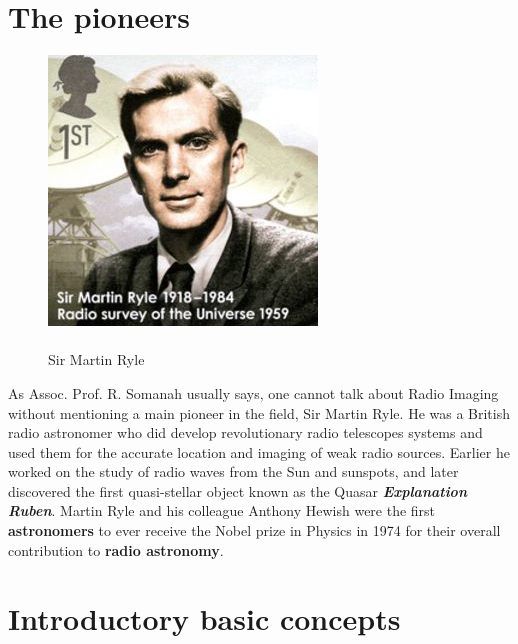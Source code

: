 \section{The pioneers}
\label{sec:pioneers}
\begin{figure}

  \begin{center}
    \includegraphics[scale= 0.45]{Figures/Sir-Martin-Ryle-C}
  \end{center}
  
 	\caption[Sir Martin Ryle]{\\Sir Martin Ryle}
	\label{fig:Martin}
	
\end{figure}

As Assoc. Prof. R. Somanah usually says, one cannot talk about Radio Imaging without mentioning a main pioneer in the field, Sir Martin Ryle. He was a British radio astronomer who did develop revolutionary radio telescopes systems and used them for the accurate location and imaging of weak radio sources. Earlier he worked on the study of radio waves from the Sun and sunspots, and later discovered the first quasi-stellar object known as the Quasar \textbf{\textit {Explanation Ruben}}. Martin Ryle and his colleague Anthony Hewish were the first \textbf{astronomers} to ever receive the Nobel prize in Physics in 1974 for their overall contribution to \textbf{radio astronomy}. 

\section{Introductory basic concepts}
